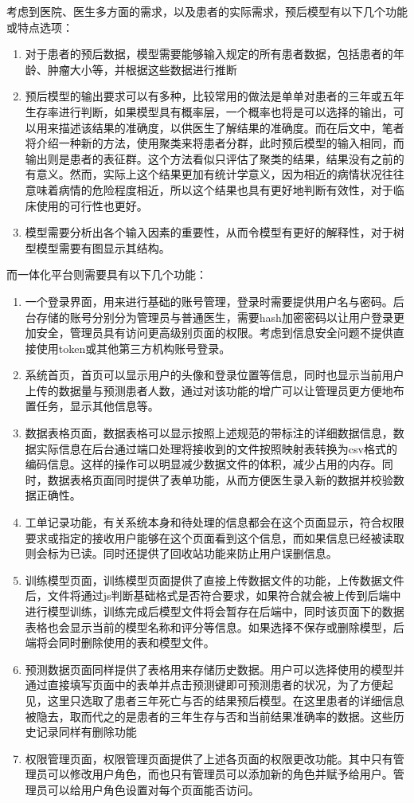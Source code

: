 考虑到医院、医生多方面的需求，以及患者的实际需求，预后模型有以下几个功能或特点选项：
\begin{enumerate}
    \item 对于患者的预后数据，模型需要能够输入规定的所有患者数据，包括患者的年龄、肿瘤大小等，并根据这些数据进行推断
    \item 预后模型的输出要求可以有多种，比较常用的做法是单单对患者的三年或五年生存率进行判断，如果模型具有概率层，一个概率也将是可以选择的输出，可以用来描述该结果的准确度，以供医生了解结果的准确度。而在后文中，笔者将介绍一种新的方法，使用聚类来将患者分群，此时预后模型的输入相同，而输出则是患者的表征群。这个方法看似只评估了聚类的结果，结果没有之前的有意义。然而，实际上这个结果更加有统计学意义，因为相近的病情状况往往意味着病情的危险程度相近，所以这个结果也具有更好地判断有效性，对于临床使用的可行性也更好。
    \item 模型需要分析出各个输入因素的重要性，从而令模型有更好的解释性，对于树型模型需要有图显示其结构。
\end{enumerate}

而一体化平台则需要具有以下几个功能：
\begin{enumerate}
    \item 一个登录界面，用来进行基础的账号管理，登录时需要提供用户名与密码。后台存储的账号分别分为管理员与普通医生，需要hash加密密码以让用户登录更加安全，管理员具有访问更高级别页面的权限。考虑到信息安全问题不提供直接使用token或其他第三方机构账号登录。
    \item 系统首页，首页可以显示用户的头像和登录位置等信息，同时也显示当前用户上传的数据量与预测患者人数，通过对该功能的增广可以让管理员更方便地布置任务，显示其他信息等。
    \item 数据表格页面，数据表格可以显示按照上述规范的带标注的详细数据信息，数据实际信息在后台通过端口处理将接收到的文件按照映射表转换为csv格式的编码信息。这样的操作可以明显减少数据文件的体积，减少占用的内存。同时，数据表格页面同时提供了表单功能，从而方便医生录入新的数据并校验数据正确性。
    \item 工单记录功能，有关系统本身和待处理的信息都会在这个页面显示，符合权限要求或指定的接收用户能够在这个页面看到这个信息，而如果信息已经被读取则会标为已读。同时还提供了回收站功能来防止用户误删信息。
    \item 训练模型页面，训练模型页面提供了直接上传数据文件的功能，上传数据文件后，文件将通过js判断基础格式是否符合要求，如果符合就会被上传到后端中进行模型训练，训练完成后模型文件将会暂存在后端中，同时该页面下的数据表格也会显示当前的模型名称和评分等信息。如果选择不保存或删除模型，后端将会同时删除使用的表和模型文件。
    \item 预测数据页面同样提供了表格用来存储历史数据。用户可以选择使用的模型并通过直接填写页面中的表单并点击预测键即可预测患者的状况，为了方便起见，这里只选取了患者三年死亡与否的结果预后模型。在这里患者的详细信息被隐去，取而代之的是患者的三年生存与否和当前结果准确率的数据。这些历史记录同样有删除功能
    \item 权限管理页面，权限管理页面提供了上述各页面的权限更改功能。其中只有管理员可以修改用户角色，而也只有管理员可以添加新的角色并赋予给用户。管理员可以给用户角色设置对每个页面能否访问。
\end{enumerate}

